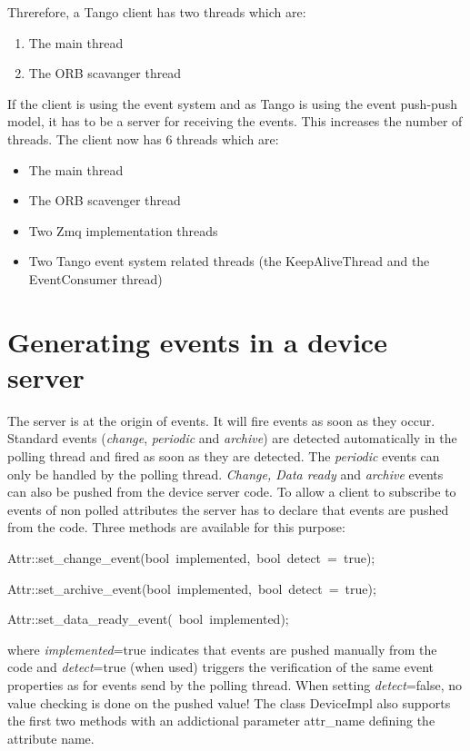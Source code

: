 Threrefore, a Tango client has two threads which are:
\begin{enumerate}
\item The main thread
\item The ORB scavanger thread
\end{enumerate}
If the client is using the event system and as Tango is using the
event push-push model, it has to be a server for receiving the events.
This increases the number of threads. The client now
has 6 threads which are:
\begin{itemize}
\item The main thread
\item The ORB scavenger thread
\item Two Zmq implementation threads
\item Two Tango event system related threads (the KeepAliveThread and the
EventConsumer thread)
\end{itemize}

\section{Generating events in a device server}

The server is at the origin of events. It will fire
events as soon as they occur. Standard events (\emph{change}, \emph{periodic}
and \emph{archive}) are detected automatically in the polling thread
and fired as soon as they are detected. The \emph{periodic} events
can only be handled by the polling thread. \emph{Change, Data ready}
and \emph{archive} events can also be pushed from the device server
code. To allow a client to subscribe to events of non polled attributes
the server has to declare that events are pushed from the code. Three
methods are available for this purpose:
\begin{lyxcode}
Attr::set\_change\_event(bool~implemented,~bool~detect~=~true);

Attr::set\_archive\_event(bool~implemented,~bool~detect~=~true);

Attr::set\_data\_ready\_event(~bool~implemented);
\end{lyxcode}
where \emph{implemented}=true indicates that events are pushed manually
from the code and \emph{detect}=true (when used) triggers the verification
of the same event properties as for events send by the polling thread.
When setting \emph{detect}=false, no value checking is done on the
pushed value! The class DeviceImpl also supports the first two methods
with an addictional parameter attr\_name defining the attribute name.

